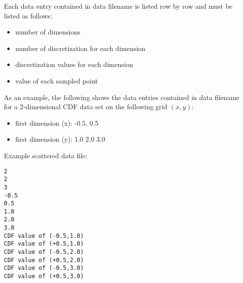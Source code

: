 Each data entry contained in data \textunderscore filename is listed row by row and must be listed as follows:
\begin{itemize}
\item number of dimensions
\item number of discretization for each dimension
\item discretization values for each dimension
\item value of each sampled point
\end{itemize}

As an example, the following shows the data entries contained in data \textunderscore filename for a 2-dimensional CDF data set on the following grid $(x,y)$:
\begin{itemize}
\item first dimension (x): -0.5, 0.5
\item first dimension (y): 1.0 2.0 3.0
\end{itemize}

Example scattered data file:
\begin{lstlisting}
2
2
3
-0.5
0.5
1.0
2.0
3.0
CDF value of (-0.5,1.0)
CDF value of (+0.5,1.0)
CDF value of (-0.5,2.0)
CDF value of (+0.5,2.0)
CDF value of (-0.5,3.0)
CDF value of (+0.5,3.0)
\end{lstlisting}

